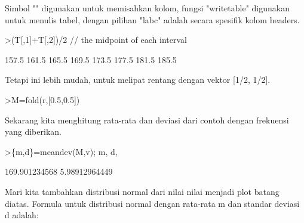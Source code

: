 \documentclass[a4paper,10pt]{article}
\begin{document}
\begin{eulernotebook}
\begin{eulercomment}
Simbol "\textbar{}" digunakan untuk memisahkan kolom, fungsi "writetable" digunakan untuk menulis
tabel, dengan pilihan "labc" adalah secara spesifik kolom headers.
\end{eulercomment}
\begin{eulerprompt}
>(T[,1]+T[,2])/2 // the midpoint of each interval
\end{eulerprompt}
\begin{euleroutput}
          157.5 
          161.5 
          165.5 
          169.5 
          173.5 
          177.5 
          181.5 
          185.5 
\end{euleroutput}
\begin{eulercomment}
Tetapi ini lebih mudah, untuk melipat rentang dengan vektor [1/2, 1/2].
\end{eulercomment}
\begin{eulerprompt}
>M=fold(r,[0.5,0.5])
\end{eulerprompt}
\begin{euleroutput}
  [157.5,  161.5,  165.5,  169.5,  173.5,  177.5,  181.5,  185.5]
\end{euleroutput}
\begin{eulercomment}
Sekarang kita menghitung rata-rata dan deviasi dari contoh dengan frekuensi yang
diberikan.
\end{eulercomment}
\begin{eulerprompt}
>\{m,d\}=meandev(M,v); m, d,
\end{eulerprompt}
\begin{euleroutput}
  169.901234568
  5.98912964449
\end{euleroutput}
\begin{eulercomment}
Mari kita tambahkan distribusi normal dari nilai nilai menjadi plot batang diatas. Formula
untuk distribusi normal dengan rata-rata m dan standar deviasi d adalah:


\end{eulercomment}
\end{eulernotebook}
\end{document}
